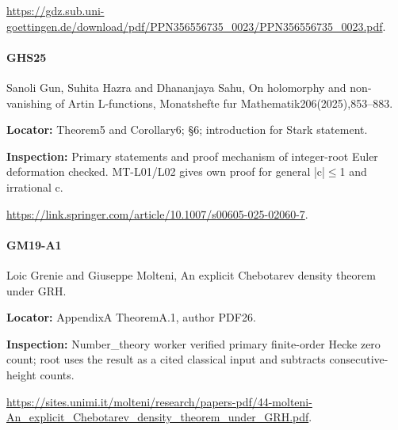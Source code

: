 \documentclass[11pt,a4paper]{article}
\begin{document}
\url{https://gdz.sub.uni-goettingen.de/download/pdf/PPN356556735_0023/PPN356556735_0023.pdf}.

\paragraph{GHS25} Sanoli Gun, Suhita Hazra and Dhananjaya Sahu, On holomorphy and non-vanishing of Artin L-functions, Monatshefte fur Mathematik206(2025),853–\allowbreak{}883.

\textbf{Locator:} Theorem5 and Corollary6; §6; introduction for Stark statement.

\textbf{Inspection:} Primary statements and proof mechanism of integer-root Euler deformation checked.\allowbreak{} MT-L01/\allowbreak{}L02 gives own proof for general |c|\ensuremath{\le}1 and irrational c.\allowbreak{}

\url{https://link.springer.com/article/10.1007/s00605-025-02060-7}.

\paragraph{GM19-A1} Loic Grenie and Giuseppe Molteni, An explicit Chebotarev density theorem under GRH.

\textbf{Locator:} AppendixA TheoremA.\allowbreak{}1, author PDF26.

\textbf{Inspection:} Number\_\allowbreak{}theory worker verified primary finite-order Hecke zero count; root uses the result as a cited classical input and subtracts consecutive-height counts.\allowbreak{}

\url{https://sites.unimi.it/molteni/research/papers-pdf/44-molteni-An_explicit_Chebotarev_density_theorem_under_GRH.pdf}.
\end{document}
